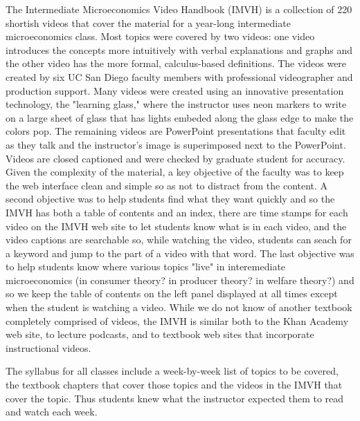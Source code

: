 \documentclass[12pt]{article}
\begin{document}
The Intermediate Microeconomics Video Handbook (IMVH) is a collection of 220 shortish videos that cover the material for a year-long intermediate microeconomics class. Most topics were covered by two videos: one video introduces the concepts more intuitively with verbal explanations and graphs and the other video has the more formal, calculus-based definitions. The videos were created by six UC San Diego faculty members with professional videographer and production support. Many videos were created using an innovative presentation technology, the "learning glass," where the instructor uses neon markers to write on a large sheet of glass that has lights embeded along the glass edge to make the colors pop. The remaining videos are PowerPoint presentations that faculty edit as they talk and the instructor's image is superimposed next to the PowerPoint. Videos are closed captioned and were checked by graduate student for accuracy. Given the complexity of the material, a key objective of the faculty was to keep the web interface clean and simple so as not to distract from the content. A second objective was to help students find what they want quickly and so the IMVH has both a table of contents and an index, there are time stamps for each video on the IMVH web site to let students know what is in each video, and the video captions are searchable so, while watching the video, students can seach for a keyword and jump to the part of a video with that word. The last objective was to help students know where various topics "live" in interemediate microeconomics (in consumer theory?  in producer theory? in welfare theory?) and so we keep the table of contents on the left panel displayed at all times except when the student is watching a video. While we do not know of another textbook completely comprised of videos, the IMVH is similar both to the Khan Academy web site, to lecture podcasts, and to textbook web sites that incorporate instructional videos.

The syllabus for all classes include a week-by-week list of topics to be covered, the textbook chapters that cover those topics and the videos in the IMVH that cover the topic.  Thus students knew what the instructor expected them to read and watch each week. 
\end{document}
